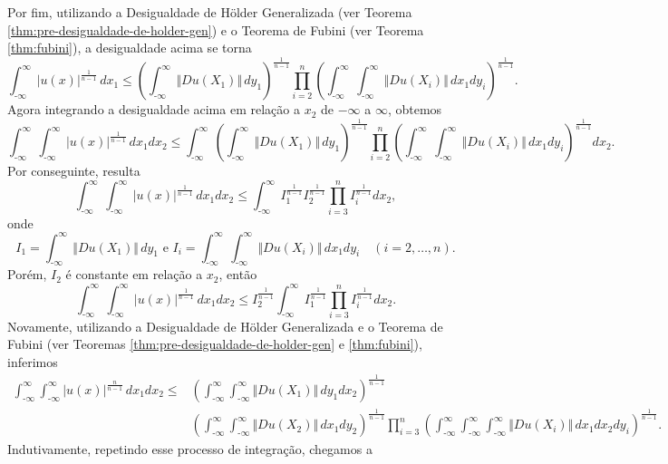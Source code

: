 \documentclass[a4paper, 11pt]{book}
\theoremstyle{definition}
\newcommand{\m}{\text{-}}
\begin{document}
\begin{prf}
\[    \]
    Por fim, utilizando a Desigualdade de Hölder Generalizada (ver Teorema \ref{thm:pre-desigualdade-de-holder-gen}) e o Teorema de Fubini (ver Teorema \ref{thm:fubini}), a desigualdade acima se torna
    \[
        \int_{\m\infty}^{\infty} |u(x)|^{\frac{1}{n-1}} \,dx_1 \leqslant \left( \int_{\m\infty}^{\infty} \Vert Du(X_1)\Vert \,dy_1 \right)^{\frac{1}{n-1}}\prod_{i=2}^n \left(\int_{\m\infty}^{\infty}   \int_{\m\infty}^{\infty} \Vert Du(X_i) \Vert \, dx_1dy_i\right)^{\frac{1}{n-1}}.
    \]
    Agora integrando a desigualdade acima em relação a $x_2$ de $-\infty$ a $\infty$, obtemos
    \[
        \int_{\m\infty}^{\infty}\int_{\m\infty}^{\infty} |u(x)|^{\frac{1}{n-1}} \,dx_1dx_2 \leqslant \int_{\m\infty}^{\infty}\!\!\left( \int_{\m\infty}^{\infty} \Vert Du(X_1)\Vert \,dy_1 \right)^{\frac{1}{n-1}}\prod_{i=2}^n \left(\int_{\m\infty}^{\infty} \!\int_{\m\infty}^{\infty} \Vert Du(X_i) \Vert \, dx_1dy_i\right)^{\frac{1}{n-1}} dx_2.
    \]
    Por conseguinte, resulta
    \[
        \int_{\m\infty}^{\infty}\int_{\m\infty}^{\infty} |u(x)|^{\frac{1}{n-1}} \,dx_1dx_2 \leqslant \int_{\m\infty}^{\infty} I_1^{\frac{1}{n-1}}I_2^{\frac{1}{n-1}}\prod_{i=3}^n I_i^{\frac{1}{n-1}} dx_2,
    \]
    onde
    \[
        I_1 = \int_{\m\infty}^{\infty} \Vert Du(X_1)\Vert \,dy_1 \text{ e } I_i = \int_{\m\infty}^{\infty} \!\int_{\m\infty}^{\infty} \Vert Du(X_i) \Vert \, dx_1dy_i \quad(i = 2,\dots,n).
    \]
    Porém, $I_2$ é constante em relação a $x_2$, então
    \[
        \int_{\m\infty}^{\infty}\int_{\m\infty}^{\infty} |u(x)|^{\frac{1}{n-1}} \,dx_1dx_2 \leqslant I_2^{\frac{1}{n-1}}\int_{\m\infty}^{\infty} I_1^{\frac{1}{n-1}}\prod_{i=3}^n I_i^{\frac{1}{n-1}} dx_2.
    \]
    Novamente, utilizando a Desigualdade de Hölder Generalizada e o Teorema de Fubini (ver Teoremas \ref{thm:pre-desigualdade-de-holder-gen} e \ref{thm:fubini}), inferimos
    {\small
    \[
        \begin{aligned}
            \int_{\m\infty}^{\infty}\int_{\m\infty}^{\infty} |u(x)|^{\frac{n}{n-1}} \,dx_1dx_2 \leqslant &\left( \int_{\m\infty}^{\infty} \int_{\m\infty}^{\infty} \Vert Du(X_1) \Vert \,dy_1 dx_2 \right)^{\frac{1}{n-1}}\\ &\left( \int_{\m\infty}^{\infty} \int_{\m\infty}^{\infty} \Vert Du(X_2) \Vert \,dx_1 dy_2 \right)^{\frac{1}{n-1}} \prod_{i=3}^n \left( \int_{\m\infty}^{\infty}\int_{\m\infty}^{\infty}\int_{\m\infty}^{\infty} \Vert Du(X_i) \Vert \,dx_1dx_2dy_i \right)^{\frac{1}{n-1}} \!\!.
        \end{aligned}
    \]\!}
    Indutivamente, repetindo esse processo de integração, chegamos a

\end{prf}
\end{document}

